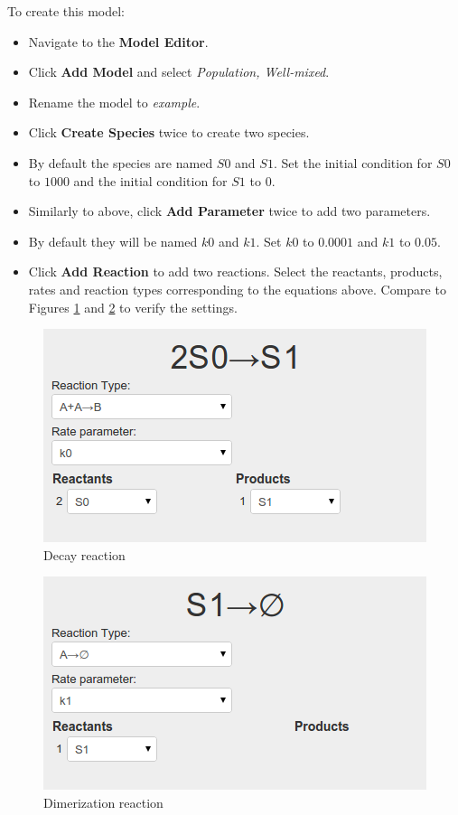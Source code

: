 To create this model:
\begin{itemize}
  \item Navigate to the \textbf{Model Editor}.
  \item Click \textbf{Add Model} and select \textit{Population, Well-mixed}.
  \item Rename the model to \textit{example}.
  \item Click \textbf{Create Species} twice to create two species.
  \item By default the species are named $S0$ and $S1$. Set the initial condition for $S0$ to $1000$ and the initial condition for $S1$ to $0$.
  \item Similarly to above, click \textbf{Add Parameter} twice to add two parameters.
  \item By default they will be named $k0$ and $k1$. Set $k0$ to $0.0001$ and $k1$ to $0.05$.
  \item Click \textbf{Add Reaction} to add two reactions. Select the reactants, products, rates and reaction types corresponding to the equations above. Compare to Figures \ref{fig:reaction2} and \ref{fig:reaction1} to verify the settings.
\end{itemize}

\begin{figure}[!htb]
\centering
\includegraphics[scale=0.64]{T1/reaction2.png}
\caption{Decay reaction}
\label{fig:reaction2}
\end{figure}

\begin{figure}[!htb]
\centering
\includegraphics[scale=0.64]{T1/reaction1.png}
\caption{Dimerization reaction}
\label{fig:reaction1}
\end{figure}

